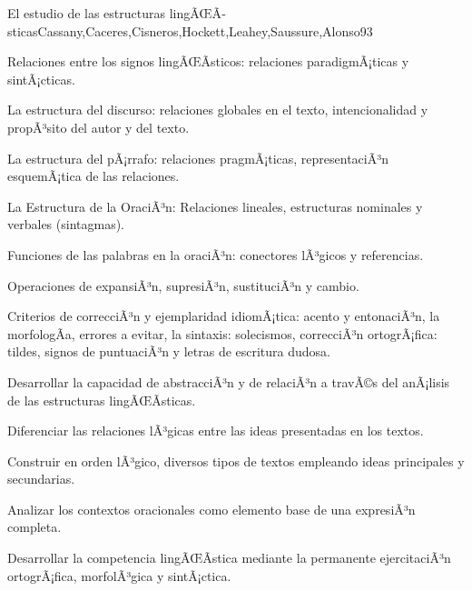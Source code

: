 \begin{syllabus}
\begin{unit}{El estudio de las estructuras lingÃŒÃ­sticas}{Cassany,Caceres,Cisneros,Hockett,Leahey,Saussure,Alonso}{9}{3}
\begin{topics}
   \item Relaciones entre los signos lingÃŒÃ­sticos: relaciones paradigmÃ¡ticas y sintÃ¡cticas.
   \item La estructura del discurso: relaciones globales en el texto, intencionalidad y propÃ³sito del autor y del texto. 
   \item La estructura del pÃ¡rrafo: relaciones pragmÃ¡ticas, representaciÃ³n esquemÃ¡tica de las relaciones. 
   \item La Estructura de la OraciÃ³n: Relaciones lineales, estructuras nominales y verbales (sintagmas).
   \item Funciones de las palabras en la oraciÃ³n: conectores lÃ³gicos y referencias.
   \item Operaciones de expansiÃ³n, supresiÃ³n, sustituciÃ³n y cambio.
   \item Criterios de correcciÃ³n y ejemplaridad idiomÃ¡tica: acento y entonaciÃ³n, la morfologÃ­a, errores a evitar, la sintaxis: solecismos, correcciÃ³n ortogrÃ¡fica: tildes, signos de puntuaciÃ³n y letras de escritura dudosa.
\end{topics}

\begin{unitgoals}
   \item Desarrollar la capacidad de abstracciÃ³n y de relaciÃ³n a travÃ©s del anÃ¡lisis de las estructuras lingÃŒÃ­sticas.
   \item Diferenciar las relaciones lÃ³gicas entre las ideas presentadas en los textos.
   \item Construir en orden lÃ³gico, diversos tipos de textos empleando ideas principales y secundarias.
   \item Analizar los contextos oracionales como elemento base de una expresiÃ³n completa.
   \item Desarrollar la competencia lingÃŒÃ­stica mediante la permanente ejercitaciÃ³n ortogrÃ¡fica, morfolÃ³gica y sintÃ¡ctica.
\end{unitgoals}
\end{unit}


\end{syllabus}
